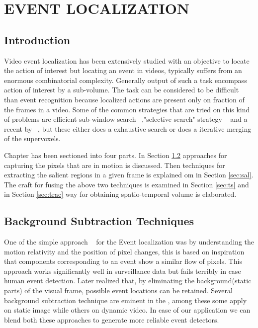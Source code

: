 \chapter{EVENT LOCALIZATION}
 \label{chap:eventLo}
\section{Introduction}
Video event localization  has been extensively studied with an objective to locate the action of interest but locating an event in videos, typically suffers from an enormous combinatorial complexity. Generally output of such a task encompass action of interest by a sub-volume. The task can be considered to be difficult than event recognition because localized actions are present only on fraction of the frames in a video. Some of the common strategies that are tried on this kind of problems are efficient sub-window search ~\citep{subwindowsearch},"selective search" strategy ~\citep{selectivesearch}  and a recent by ~\cite{tubelet}, but these either does a exhaustive search or does a iterative merging of the supervoxels. 

\par Chapter has been sectioned into four parts. In Section \ref{sec:bst} approaches for capturing the pixels that are in motion is discussed.  Then techniques for extracting the salient regions in a given frame is explained om in Section \ref{sec:sal}. The craft for fusing the above two techniques is examined in Section \ref{sec:ts} and in Section \ref{sec:trac} way for obtaining spatio-temporal volume is elaborated.

\section{Background Subtraction Techniques} 
 \label{sec:bst}
\par One of the simple approach ~\citep{Basharat08} for the Event localization was by understanding the motion relativity and the position of pixel changes, this is based on inspiration that components corresponding to an event show a similar flow of pixels. This approach works significantly well in surveillance data but fails terribly in case human event detection. Later realized that, by eliminating the background(static parts) of the visual frame,  possible event locations can be retained.  Several background subtraction technique are eminent in the \cite{Piccardi04}, among these some apply on static image while others on dynamic video. In case of our application we can blend both these approaches to generate more reliable event detectors.

